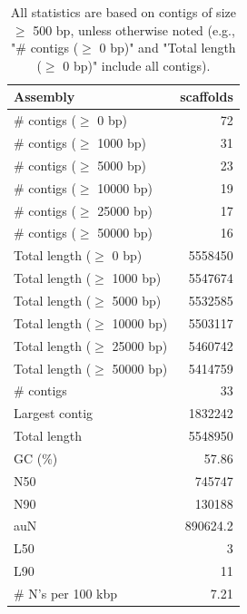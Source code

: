 \documentclass[12pt,a4paper]{article}
\begin{document}
\begin{table}[ht]
\begin{center}
\caption{All statistics are based on contigs of size $\geq$ 500 bp, unless otherwise noted (e.g., "\# contigs ($\geq$ 0 bp)" and "Total length ($\geq$ 0 bp)" include all contigs).}
\begin{tabular}{|l*{1}{|r}|}
\hline
Assembly & scaffolds \\ \hline
\# contigs ($\geq$ 0 bp) & 72 \\ \hline
\# contigs ($\geq$ 1000 bp) & 31 \\ \hline
\# contigs ($\geq$ 5000 bp) & 23 \\ \hline
\# contigs ($\geq$ 10000 bp) & 19 \\ \hline
\# contigs ($\geq$ 25000 bp) & 17 \\ \hline
\# contigs ($\geq$ 50000 bp) & 16 \\ \hline
Total length ($\geq$ 0 bp) & 5558450 \\ \hline
Total length ($\geq$ 1000 bp) & 5547674 \\ \hline
Total length ($\geq$ 5000 bp) & 5532585 \\ \hline
Total length ($\geq$ 10000 bp) & 5503117 \\ \hline
Total length ($\geq$ 25000 bp) & 5460742 \\ \hline
Total length ($\geq$ 50000 bp) & 5414759 \\ \hline
\# contigs & 33 \\ \hline
Largest contig & 1832242 \\ \hline
Total length & 5548950 \\ \hline
GC (\%) & 57.86 \\ \hline
N50 & 745747 \\ \hline
N90 & 130188 \\ \hline
auN & 890624.2 \\ \hline
L50 & 3 \\ \hline
L90 & 11 \\ \hline
\# N's per 100 kbp & 7.21 \\ \hline
\end{tabular}
\end{center}
\end{table}
\end{document}
